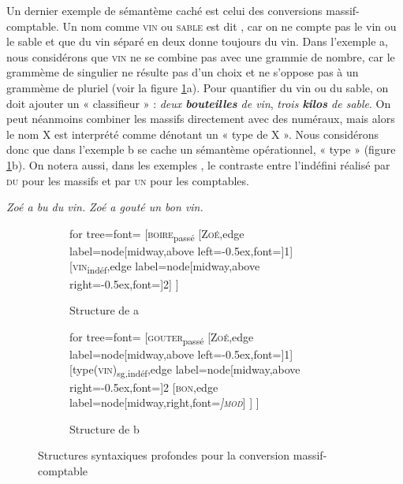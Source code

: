 Un dernier exemple de sémantème caché est celui des conversions massif-comptable. Un nom comme \textsc{vin} ou \textsc{sable} est dit , car on ne compte pas le vin ou le sable et que du vin séparé en deux donne toujours du vin. Dans l’exemple a, nous considérons que \textsc{vin} ne se combine pas avec une grammie de nombre, car le grammème de singulier ne résulte pas d’un choix et ne s’oppose pas à un grammème de pluriel (voir la figure \ref{fig:13-vin}a). Pour quantifier du vin ou du sable, on doit ajouter un « classifieur » : \textit{deux \textbf{bouteilles} de vin}, \textit{trois \textbf{kilos} de sable}. On peut néanmoins combiner les massifs directement avec des numéraux, mais alors le nom X est interprété comme dénotant un « type de X ». Nous considérons donc que dans l’exemple b se cache un sémantème opérationnel, « type » (figure \ref{fig:13-vin}b). On notera aussi, dans les exemples , le contraste entre l’indéfini réalisé par \textsc{du} pour les massifs et par \textsc{un} pour les comptables.

\ea\label{ex:13-vin}
\ea \textit{Zoé a bu du vin.}
\ex \textit{Zoé a gouté un bon vin.}\z\z

\begin{figure}
	\begin{subfigure}[b]{0.5\textwidth}
		\centering
		\begin{forest} for tree={font=\normalfont}
			[\textsc{boire}\textsubscript{passé}
				[\textsc{Zoé},edge label={node[midway,above left=-0.5ex,font=\footnotesize]{1}}]
				[\textsc{vin}\textsubscript{indéf},edge label={node[midway,above right=-0.5ex,font=\footnotesize]{2}}]
			]
		\end{forest}
		\caption{Structure de a}
	\end{subfigure}%
	\hfill
	\begin{subfigure}[b]{0.5\textwidth}
		\centering
		\begin{forest} for tree={font=\normalfont}
			[\textsc{gouter}\textsubscript{passé}
				[\textsc{Zoé},edge label={node[midway,above left=-0.5ex,font=\footnotesize]{1}}]
				[type(\textsc{vin})\textsubscript{sg,indéf},edge label={node[midway,above right=-0.5ex,font=\footnotesize]{2}}
					[\textsc{bon},edge label={node[midway,right,font=\footnotesize\itshape]{\textsc{mod}}}]
				]
			]
		\end{forest}
		\caption{Structure de b}
	\end{subfigure}
\caption{Structures syntaxiques profondes pour la conversion massif-comptable\label{fig:13-vin}}
\end{figure}

